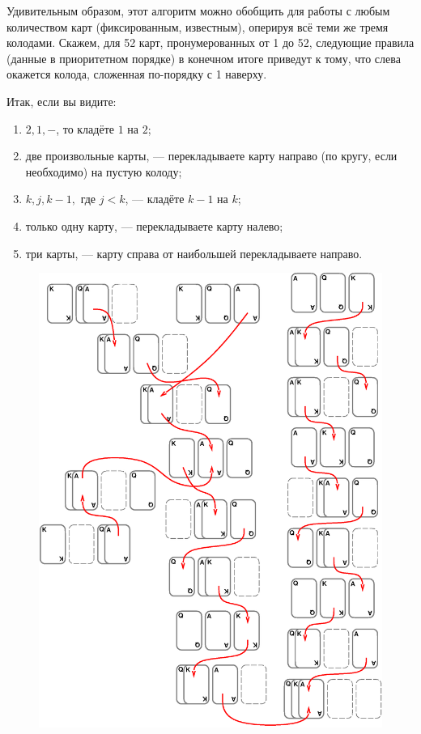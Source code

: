 Удивительным образом, этот алгоритм можно обобщить для работы с любым количеством карт (фиксированным, известным), оперируя всё теми же тремя колодами.
Скажем, для 52 карт, пронумерованных от 1 до 52, следующие правила (данные в приоритетном порядке) в конечном итоге приведут к тому, что слева окажется колода, сложенная по-порядку с 1 наверху.

Итак, если вы видите:

\begin{enumerate}[(1)]
\item $2, 1, -$, то кладёте $1$ на $2$;
\item две произвольные карты, --- перекладываете карту направо (по кругу, если необходимо) на пустую колоду;
\item $k, j, k-1,$ где $j < k$, --- кладёте $k-1$ на $k$;
\item только одну карту, --- перекладываете карту налево;
\item три карты, --- карту справа от наибольшей перекладываете направо.
\end{enumerate}

\begin{figure}[h!]
\centering
\includegraphics[scale=0.55]{Figs/Handicaps/conway}
\end{figure}

